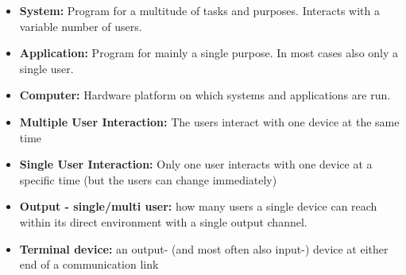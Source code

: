 \begin{itemize}
\item \textbf{System:} Program for a multitude of tasks and purposes. Interacts with a variable number of users.
\item \textbf{Application:} Program for mainly a single purpose. In most cases also only a single user.
\item \textbf{Computer:} Hardware platform on which systems and applications are run.
\item \textbf{Multiple User Interaction:} The users interact with one device at the same time 
\item \textbf{Single User Interaction:} Only one user interacts with one device  at a specific time (but the users can change immediately)
\item \textbf{Output - single/multi user:} how many users a single device can reach within its direct environment with a single output channel.
\item \textbf{Terminal device:} an output- (and most often also input-) device at either end of a communication link
\end{itemize}